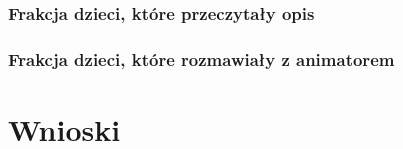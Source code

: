 \documentclass[conference]{IEEEtran}
\begin{document}
\subsubsection{Frakcja dzieci, które przeczytały opis}

\subsubsection{Frakcja dzieci, które rozmawiały z animatorem}

\section{Wnioski}
\end{document}
